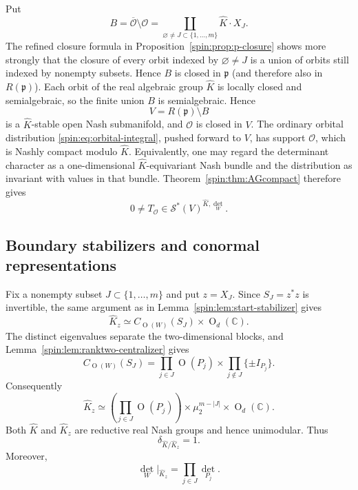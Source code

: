 \documentclass[10pt,a4paper]{amsart}
\numberwithin{equation}{section}
\newcommand{\C}{\mathbb C}
\newcommand{\Or}{\operatorname{O}}
\newcommand{\fp}{\mathfrak p}
\newcommand{\cO}{\mathcal O}
\newcommand{\cS}{\mathcal S}
\begin{document}
Put
\begin{equation}\label{spin:eq:Bboundary}
  B=\overline{\cO}\setminus\cO
   =\coprod_{\varnothing\ne J\subset\{1,\ldots,m\}}
     \widehat K\cdot X_J.
\end{equation}
The refined closure formula in Proposition~\ref{spin:prop:p-closure} shows
more strongly that the closure of every orbit indexed by
$\varnothing\ne J$ is a union of orbits still indexed by nonempty subsets.
Hence $B$ is closed in $\fp$ (and therefore also in $R(\fp)$).  Each orbit of the real algebraic group
$\widehat K$ is locally closed and semialgebraic, so the finite union $B$ is
semialgebraic.  Hence
\begin{equation}\label{spin:eq:Vopen}
  V=R(\fp)\setminus B
\end{equation}
is a $\widehat K$-stable open Nash submanifold, and $\cO$ is closed in $V$.
The ordinary orbital distribution \eqref{spin:eq:orbital-integral}, pushed forward
to $V$, has support $\cO$, which is Nashly compact modulo $\widehat K$.
Equivalently, one may regard the determinant character as a one-dimensional
$\widehat K$-equivariant Nash bundle and the distribution as invariant with
values in that bundle.  Theorem~\ref{spin:thm:AGcompact} therefore gives
\begin{equation}\label{spin:eq:TO-Schwartz}
  0\ne T_{\cO}\in\cS^*(V)^{\widehat K,\det_W}.
\end{equation}

\subsection{Boundary stabilizers and conormal representations}\label{spin:sec:conormal}

Fix a nonempty subset $J\subset\{1,\ldots,m\}$ and put $z=X_J$.  Since
$S_J=z^*z$ is invertible, the same argument as in
Lemma~\ref{spin:lem:start-stabilizer} gives
\begin{equation}\label{spin:eq:boundary-stabilizer}
  \widehat K_z
  \simeq
  C_{\Or(W)}(S_J)\times\Or_d(\C).
\end{equation}
The distinct eigenvalues separate the two-dimensional blocks, and
Lemma~\ref{spin:lem:ranktwo-centralizer} gives
\begin{equation}\label{spin:eq:boundary-centralizer}
  C_{\Or(W)}(S_J)
  =
  \prod_{j\in J}\Or(P_j)
  \times
  \prod_{j\notin J}\{\pm I_{P_j}\}.
\end{equation}
Consequently
\begin{equation}\label{spin:eq:boundary-stabilizer2}
  \widehat K_z
  \simeq
  \left(\prod_{j\in J}\Or(P_j)\right)
  \times\mu_2^{m-|J|}
  \times\Or_d(\C).
\end{equation}
Both $\widehat K$ and $\widehat K_z$ are reductive real Nash groups and hence
unimodular.  Thus
\begin{equation}\label{spin:eq:modular-trivial}
  \delta_{\widehat K/\widehat K_z}=1.
\end{equation}
Moreover,
\begin{equation}\label{spin:eq:detW-boundary}
  \det_W|_{\widehat K_z}
  =\prod_{j\in J}\det_{P_j}.
\end{equation}
\end{document}
